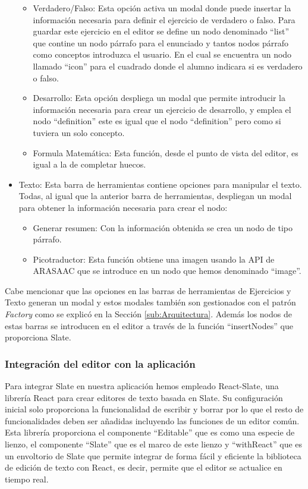 \begin{itemize}
\begin{itemize}
          \item Verdadero/Falso: Esta opción activa un modal donde puede insertar la información necesaria para definir el ejercicio de verdadero o falso. Para guardar este ejercicio en el editor se define un nodo denominado ``list'' que contine un nodo párrafo para el enunciado y tantos nodos párrafo como conceptos introduzca el usuario. En el cual se encuentra un nodo llamado ``icon'' para el cuadrado donde el alumno indicara si es verdadero o falso.
          \item Desarrollo: Esta opción despliega un modal que permite introducir la información necesaria para crear un ejercicio de desarrollo, y emplea el nodo ``definition'' este es igual que el nodo ``definition'' pero como si tuviera un solo concepto.
          \item Formula Matemática: Esta función, desde el punto de vista del editor, es igual a la de completar huecos.
        \end{itemize}
  \item Texto: Esta barra de herramientas contiene opciones para manipular el texto. Todas, al igual que la anterior barra de herramientas, despliegan un modal para obtener la información necesaria para crear el nodo:
        \begin{itemize}
          \item Generar resumen: Con la información obtenida se crea un nodo de tipo párrafo.
          \item Picotraductor: Esta función obtiene una imagen usando la API de ARASAAC que se introduce en un nodo que hemos denominado ``image''.
        \end{itemize}
\end{itemize}

Cabe mencionar que las opciones en las barras de herramientas de Ejercicios y Texto generan un modal y estos modales también son gestionados con el patrón \textit{Factory} como se explicó en la Sección \ref{sub:Arquitectura}. Además los nodos de estas barras se introducen en el editor a través de la función ``insertNodes'' que proporciona Slate.


\subsubsection{Integración del editor con la aplicación}
Para integrar Slate en nuestra aplicación hemos empleado React-Slate, una librería React para crear editores de texto basada en Slate. Su configuración inicial solo proporciona la funcionalidad de escribir y borrar por lo que el resto de funcionalidades deben ser añadidas incluyendo las funciones de un editor común. Esta librería proporciona el componente ``Editable'' que es como una especie de lienzo,  el componente ``Slate'' que es el marco de este lienzo y ``withReact'' que es un envoltorio de Slate que permite integrar de forma fácil y eficiente la biblioteca de edición de texto con React, es decir, permite que el editor se actualice en tiempo real.

